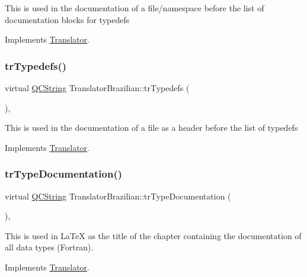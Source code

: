 This is used in the documentation of a file/namespace before the list of documentation blocks for typedefs 

Implements \mbox{\hyperlink{class_translator}{Translator}}.

\mbox{\label{class_translator_brazilian_aa7b2d1f6f9a70c3e63433ddd7935824d}} 
\subsubsection{\texorpdfstring{trTypedefs()}{trTypedefs()}}
{\footnotesize\ttfamily virtual \mbox{\hyperlink{class_q_c_string}{Q\+C\+String}} Translator\+Brazilian\+::tr\+Typedefs (\begin{DoxyParamCaption}{ }\end{DoxyParamCaption})\hspace{0.3cm}{\ttfamily [inline]}, {\ttfamily [virtual]}}

This is used in the documentation of a file as a header before the list of typedefs 

Implements \mbox{\hyperlink{class_translator}{Translator}}.

\mbox{\label{class_translator_brazilian_a47e94c97282187c82e96e0e860229c04}} 
\subsubsection{\texorpdfstring{trTypeDocumentation()}{trTypeDocumentation()}}
{\footnotesize\ttfamily virtual \mbox{\hyperlink{class_q_c_string}{Q\+C\+String}} Translator\+Brazilian\+::tr\+Type\+Documentation (\begin{DoxyParamCaption}{ }\end{DoxyParamCaption})\hspace{0.3cm}{\ttfamily [inline]}, {\ttfamily [virtual]}}

This is used in La\+TeX as the title of the chapter containing the documentation of all data types (Fortran). 

Implements \mbox{\hyperlink{class_translator}{Translator}}.

